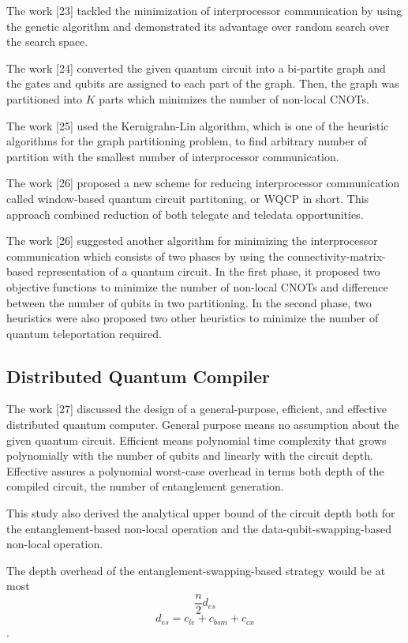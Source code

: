 The work [23] tackled the minimization of interprocessor communication by using the genetic algorithm and demonstrated its advantage over random search over the search space.

The work [24] converted the given quantum circuit into a bi-partite graph and the gates and qubits are assigned to each part of the graph.  Then, the graph was partitioned into $K$ parts which minimizes the number of non-local CNOTs.

The work [25] used the Kernigrahn-Lin algorithm, which is one of the heuristic algorithms for the graph partitioning problem, to find arbitrary number of partition with the smallest number of interprocessor communication.

The work [26] proposed a new scheme for reducing interprocessor communication called window-based quantum circuit partitoning, or WQCP in short.  This approach combined reduction of both telegate and teledata opportunities. 

The work [26] suggested another algorithm for minimizing the interprocessor communication which consists of two phases by using the connectivity-matrix-based representation of a quantum circuit.
In the first phase, it proposed two objective functions to minimize the number of non-local CNOTs and difference between the number of qubits in two partitioning.  In the second phase, two heuristics were also proposed two other heuristics to minimize the number of quantum teleportation required.

\subsection{Distributed Quantum Compiler}

The work [27] discussed the design of a general-purpose, efficient, and effective distributed quantum computer. General purpose means no assumption about the given quantum circuit. Efficient means polynomial time complexity that grows polynomially with the number of qubits and linearly with the circuit depth.  Effective assures a polynomial worst-case overhead in terms both depth of the compiled circuit, the number of entanglement generation.

 This study also derived the analytical upper bound of the circuit depth both for the entanglement-based non-local operation and the data-qubit-swapping-based non-local operation.
 
 The depth overhead of the entanglement-swapping-based strategy would be at most 
 $$\frac{n}{2}d_{es}$$
 $$d_{es} = c_{le} + c_{bsm} + c_{cx}$$. 
 
